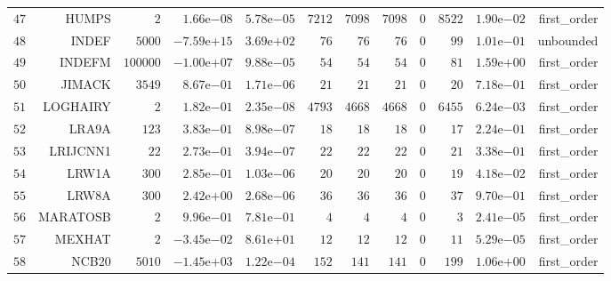 \begin{longtable}{rrrrrrrrrrrr}
  \(    47\) & HUMPS & \(     2\) & \( 1.66\)e\(-08\) & \( 5.78\)e\(-05\) & \(  7212\) & \(  7098\) & \(  7098\) & \(     0\) & \(  8522\) & \( 1.90\)e\(-02\) & first\_order \\
  \(    48\) & INDEF & \(  5000\) & \(-7.59\)e\(+15\) & \( 3.69\)e\(+02\) & \(    76\) & \(    76\) & \(    76\) & \(     0\) & \(    99\) & \( 1.01\)e\(-01\) & unbounded \\
  \(    49\) & INDEFM & \(100000\) & \(-1.00\)e\(+07\) & \( 9.88\)e\(-05\) & \(    54\) & \(    54\) & \(    54\) & \(     0\) & \(    81\) & \( 1.59\)e\(+00\) & first\_order \\
  \(    50\) & JIMACK & \(  3549\) & \( 8.67\)e\(-01\) & \( 1.71\)e\(-06\) & \(    21\) & \(    21\) & \(    21\) & \(     0\) & \(    20\) & \( 7.18\)e\(-01\) & first\_order \\
  \(    51\) & LOGHAIRY & \(     2\) & \( 1.82\)e\(-01\) & \( 2.35\)e\(-08\) & \(  4793\) & \(  4668\) & \(  4668\) & \(     0\) & \(  6455\) & \( 6.24\)e\(-03\) & first\_order \\
  \(    52\) & LRA9A & \(   123\) & \( 3.83\)e\(-01\) & \( 8.98\)e\(-07\) & \(    18\) & \(    18\) & \(    18\) & \(     0\) & \(    17\) & \( 2.24\)e\(-01\) & first\_order \\
  \(    53\) & LRIJCNN1 & \(    22\) & \( 2.73\)e\(-01\) & \( 3.94\)e\(-07\) & \(    22\) & \(    22\) & \(    22\) & \(     0\) & \(    21\) & \( 3.38\)e\(-01\) & first\_order \\
  \(    54\) & LRW1A & \(   300\) & \( 2.85\)e\(-01\) & \( 1.03\)e\(-06\) & \(    20\) & \(    20\) & \(    20\) & \(     0\) & \(    19\) & \( 4.18\)e\(-02\) & first\_order \\
  \(    55\) & LRW8A & \(   300\) & \( 2.42\)e\(+00\) & \( 2.68\)e\(-06\) & \(    36\) & \(    36\) & \(    36\) & \(     0\) & \(    37\) & \( 9.70\)e\(-01\) & first\_order \\
  \(    56\) & MARATOSB & \(     2\) & \( 9.96\)e\(-01\) & \( 7.81\)e\(-01\) & \(     4\) & \(     4\) & \(     4\) & \(     0\) & \(     3\) & \( 2.41\)e\(-05\) & first\_order \\
  \(    57\) & MEXHAT & \(     2\) & \(-3.45\)e\(-02\) & \( 8.61\)e\(+01\) & \(    12\) & \(    12\) & \(    12\) & \(     0\) & \(    11\) & \( 5.29\)e\(-05\) & first\_order \\
  \(    58\) & NCB20 & \(  5010\) & \(-1.45\)e\(+03\) & \( 1.22\)e\(-04\) & \(   152\) & \(   141\) & \(   141\) & \(     0\) & \(   199\) & \( 1.06\)e\(+00\) & first\_order \\

\end{longtable}
